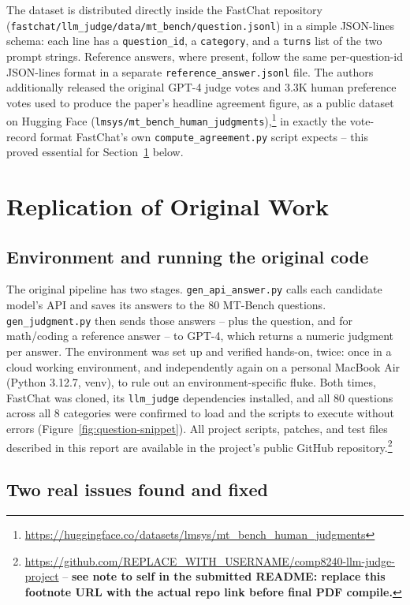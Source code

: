 \documentclass[11pt,twocolumn]{article}
\begin{document}
The dataset is distributed directly inside the FastChat repository
(\texttt{fastchat/llm\_judge/data/mt\_bench/question.jsonl}) in a simple JSON-lines schema: each
line has a \texttt{question\_id}, a \texttt{category}, and a \texttt{turns} list of the two prompt
strings. Reference answers, where present, follow the same per-question-id JSON-lines format in a
separate \texttt{reference\_answer.jsonl} file. The authors additionally released the original
GPT-4 judge votes and 3.3K human preference votes used to produce the paper's headline agreement
figure, as a public dataset on Hugging Face
(\texttt{lmsys/mt\_bench\_human\_judgments}),\footnote{\url{https://huggingface.co/datasets/lmsys/mt_bench_human_judgments}}
in exactly the vote-record format FastChat's own \texttt{compute\_agreement.py} script expects --
this proved essential for Section~\ref{sec:replication} below.

\section{Replication of Original Work}
\label{sec:replication}

\subsection{Environment and running the original code}

The original pipeline has two stages. \texttt{gen\_api\_answer.py} calls each candidate model's API
and saves its answers to the 80 MT-Bench questions. \texttt{gen\_judgment.py} then sends those
answers -- plus the question, and for math/coding a reference answer -- to GPT-4, which returns a
numeric judgment per answer. The environment was set up and verified hands-on, twice: once in a
cloud working environment, and independently again on a personal MacBook Air (Python 3.12.7,
venv), to rule out an environment-specific fluke. Both times, FastChat was cloned, its
\texttt{llm\_judge} dependencies installed, and all 80 questions across all 8 categories were
confirmed to load and the scripts to execute without errors (Figure~\ref{fig:question-snippet}).
All project scripts, patches, and test files described in this report are available in the
project's public GitHub repository.\footnote{\url{https://github.com/REPLACE_WITH_USERNAME/comp8240-llm-judge-project} --
\textbf{see note to self in the submitted README: replace this footnote URL with the actual repo
link before final PDF compile.}}

\subsection{Two real issues found and fixed}
\end{document}
